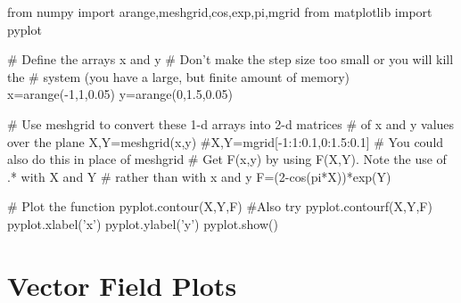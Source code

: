 \begin{codeexample}
\begin{VerbatimOut}{\listingFile}
from numpy import arange,meshgrid,cos,exp,pi,mgrid
from matplotlib import pyplot

# Define the arrays x and y
# Don't make the step size too small or you will kill the
# system (you have a large, but finite amount of memory)
x=arange(-1,1,0.05)
y=arange(0,1.5,0.05)

# Use meshgrid to convert these 1-d arrays into 2-d matrices
# of x and y values over the plane
X,Y=meshgrid(x,y)
#X,Y=mgrid[-1:1:0.1,0:1.5:0.1]  # You could also do this in place of meshgrid
# Get F(x,y) by using F(X,Y). Note the use of .* with X and Y
# rather than with x and y
F=(2-cos(pi*X))*exp(Y)

# Plot the function
pyplot.contour(X,Y,F)  #Also try pyplot.contourf(X,Y,F)
pyplot.xlabel('x')
pyplot.ylabel('y')
pyplot.show()
\end{VerbatimOut}
\end{codeexample}

\section{Vector Field Plots}
 

